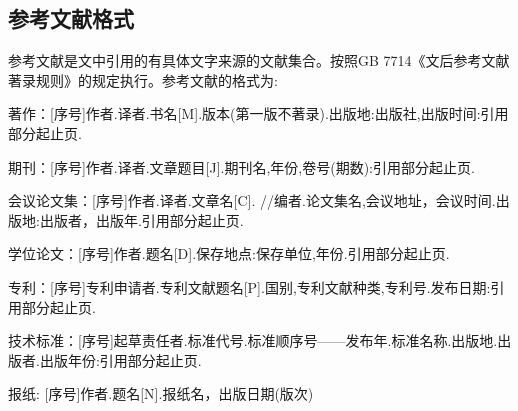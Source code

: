 \subsection{参考文献格式}

参考文献是文中引用的有具体文字来源的文献集合。按照GB 7714《文后参考文献著录规则》的规定执行。参考文献的格式为:

著作：[序号]作者.译者.书名[M].版本(第一版不著录).出版地:出版社,出版时间:引用部分起止页.

期刊：[序号]作者.译者.文章题目[J].期刊名,年份,卷号(期数):引用部分起止页.

会议论文集：[序号]作者.译者.文章名[C]. //编者.论文集名,会议地址，会议时间.出版地:出版者，出版年.引用部分起止页.

学位论文：[序号]作者.题名[D].保存地点:保存单位,年份.引用部分起止页.

专利：[序号]专利申请者.专利文献题名[P].国别,专利文献种类,专利号.发布日期:引用部分起止页.

技术标准：[序号]起草责任者.标准代号.标准顺序号——发布年.标准名称.出版地.出版者.出版年份:引用部分起止页.

报纸: [序号]作者.题名[N].报纸名，出版日期(版次)


